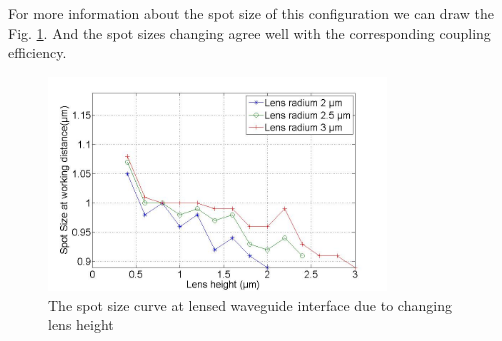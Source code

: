 For more information about the spot size of this configuration we can draw the Fig. \ref{fig:lensed_guide_spot_size_curve}. And the spot sizes changing agree well with the corresponding coupling efficiency.
\begin{figure}[!ht]
\centering
\includegraphics[width=0.8\textwidth]{bilder/spot_fix_lens_radium_hxx}
\caption{The spot size curve at lensed waveguide interface due to changing lens height}
\label{fig:lensed_guide_spot_size_curve}
\end{figure}

